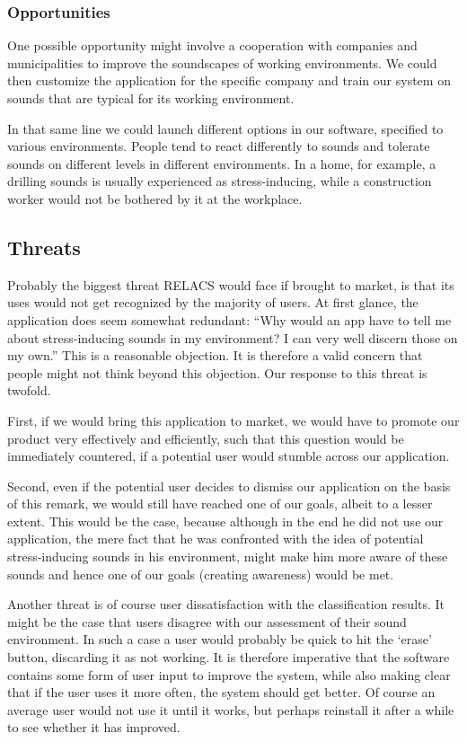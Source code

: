 \documentclass[a4paper]{article}
\begin{document}
\subsubsection{Opportunities}
One possible opportunity might involve a cooperation with companies and municipalities to improve the soundscapes of working environments. We could then customize the application for the specific company and train our system on sounds that are typical for its working environment.

In that same line we could launch different options in our software, specified to various environments. People tend to react differently to sounds and tolerate sounds on different levels in different environments. In a home, for example, a drilling sounds is usually experienced as stress-inducing, while a construction worker would not be bothered by it at the workplace. 

\subsection{Threats}
Probably the biggest threat RELACS would face if brought to market, is that its uses would not get recognized by the majority of users. At first glance, the application does seem somewhat redundant: ``Why would an app have to tell me about stress-inducing sounds in my environment? I can very well discern those on my own.'' This is a reasonable objection. It is therefore a valid concern that people might not think beyond this objection. Our response to this threat is twofold.

First, if we would bring this application to market, we would have to promote our product very effectively and efficiently, such that this question would be immediately countered, if a potential user would stumble across our application. 

Second, even if the potential user decides to dismiss our application on the basis of this remark, we would still have reached one of our goals, albeit to a lesser extent. This would be the case, because although in the end he did not use our application, the mere fact that he was confronted with the idea of potential stress-inducing sounds in his environment, might make him more aware of these sounds and hence one of our goals (creating awareness) would be met.

Another threat is of course user dissatisfaction with the classification results. It might be the case that users disagree with our assessment of their sound environment. In such a case a user would probably be quick to hit the `erase' button, discarding it as not working. It is therefore imperative that the software contains some form of user input to improve the system, while also making clear that if the user uses it more often, the system should get better. Of course an average user would not use it until it works, but perhaps reinstall it after a while to see whether it has improved.
\end{document}
